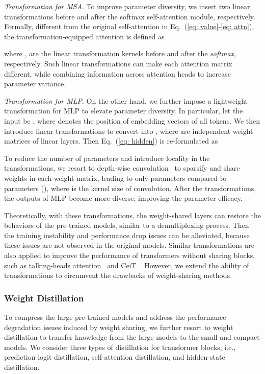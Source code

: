 \documentclass[10pt,twocolumn,letterpaper]{article}
\begin{document}
    \textit{Transformation for MSA}. To improve parameter diversity, we insert two linear transformations before and after the softmax self-attention module, respectively. Formally, different from the original self-attention in Eq.~(\ref{eq: value}-\ref{eq: attn}), the transformation-equipped attention is defined as 
    \vspace{-2mm}
    
    where ,  are the linear transformation kernels before and after the \emph{softmax}, respectively. Such linear transformations can make each attention matrix  different, while combining information across attention heads to increase parameter variance. 
    
    \textit{Transformation for MLP}. On the other hand, we further impose a lightweight transformation for MLP to elevate parameter diversity. In particular, let the input be , where  denotes the  position of embedding vectors of all tokens. We then introduce  linear transformations to convert  into , where  are independent weight matrices of linear layers. Then Eq.~(\ref{eq: hidden}) is re-formulated as
    \vspace{-5mm}
    
    To reduce the number of parameters and introduce locality in the transformations, we resort to depth-wise convolution~\cite{xception} to sparsify and share weights in each weight matrix, leading to only  parameters compared to  parameters (), where  is the kernel size of convolution. After the transformations, the outputs of MLP become more diverse, improving the parameter efficacy.
    
    Theoretically, with these transformations, the weight-shared layers can restore the behaviors of the pre-trained models, similar to a demultiplexing process. Then the training instability and performance drop issues can be alleviated, because these issues are not observed in the original models. Similar transformations are also applied to improve the performance of transformers without sharing blocks, such as talking-heads attention~\cite{talking_head} and CeiT~\cite{ceit}. However, we extend the ability of transformations to circumvent the drawbacks of weight-sharing methods.
    
\vspace{-0.3cm}
\subsubsection{Weight Distillation}
To compress the large pre-trained models and address the performance degradation issues induced by weight sharing, we further resort to weight distillation to transfer knowledge from the large models to the small and compact models. We consider three types of distillation for transformer blocks, i.e., prediction-logit distillation, self-attention distillation, and hidden-state distillation.
\end{document}
